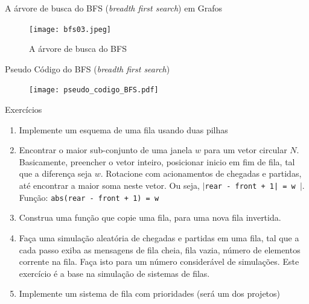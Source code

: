 \begin{frame}[c]{A árvore de busca do BFS (\textit{breadth first search})  em Grafos}

 	\begin{figure}[!htpb]
	\centering
  \texttt{[image: bfs03.jpeg]}
 \caption{A árvore de busca do BFS}
	\end{figure} 
\end{frame}


\begin{frame}[c]{Pseudo Código do BFS (\textit{breadth first search})  }

 	\begin{figure}[!htpb]
	\centering
  \texttt{[image: pseudo\_codigo\_BFS.pdf]}
	\end{figure} 
\end{frame}





\begin{frame}{Exercícios}
	
	\begin{enumerate}
	\item Implemente um esquema de uma fila usando duas pilhas
	
	\item Encontrar o maior sub-conjunto de uma janela $w$ para um vetor circular
	$N$. Basicamente, preencher o vetor inteiro, posicionar inicio em fim de fila,
	tal que a diferença seja $w$. Rotacione com acionamentos de 
	chegadas e partidas, até encontrar a maior soma neste vetor. Ou seja,
  \texttt{$\mid $rear - front + 1| = w $\mid $}. 
  Função: \texttt{abs(rear - front + 1) = w}
	 
	 
	\item Construa uma função que copie uma fila, para uma nova fila invertida.
	
	\item Faça uma simulação aleatória de chegadas e partidas em uma fila,
	tal que a cada passo exiba as mensagens de fila cheia, fila vazia,
	número de elementos corrente na fila. Faça isto para um número considerável
	de simulações. Este exercício é a base na simulação de sistemas de filas.
	
	\item Implemente um sistema de fila com prioridades (será um dos projetos)
	
	
	
	
	\end{enumerate}
	
\end{frame}





